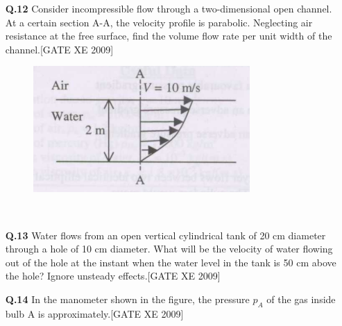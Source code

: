 \documentclass[journal,12pt,onecolumn]{IEEEtran}
\theoremstyle{remark}
\begin{document}
\begin{enumerate}
\begin{enumerate}
\item[\textbf{Q.12}] Consider incompressible flow through a two-dimensional open channel. At a certain section A-A, the velocity profile is parabolic. Neglecting air resistance at the free surface, find the volume flow rate per unit width of the channel.\hfill[GATE XE 2009]\\
\begin{figure}[h]
\includegraphics[width=0.5\columnwidth]{figs/fig2.png}
\centering
\end{figure}\\
\begin{enumerate}
\end{enumerate}


\vspace{0.3cm}

\item[\textbf{Q.13}] Water flows from an open vertical cylindrical tank of 20 cm diameter through a hole of 10 cm diameter. What will be the velocity of water flowing out of the hole at the instant when the water level in the tank is 50 cm above the hole? Ignore unsteady effects.\hfill[GATE XE 2009]\\
\begin{enumerate}
\end{enumerate}


\vspace{0.3cm}


\item[\textbf{Q.14}] In the manometer shown in the figure, the pressure $p_A$ of the gas inside bulb A is approximately.\hfill[GATE XE 2009]\\


\end{enumerate}
\end{enumerate}
\end{document}
